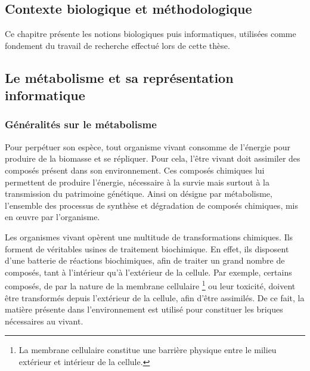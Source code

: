 \begin{refsegment}
	\chapter{Contexte biologique et méthodologique}

    Ce chapitre présente les notions biologiques puis informatiques, utilisées comme fondement du travail de recherche effectué lors de cette thèse.
    
    
    \section{Le métabolisme et sa représentation informatique}
    \subsection{Généralités sur le métabolisme}
    
    Pour perpétuer son espèce, tout organisme vivant consomme de l'énergie pour produire de la biomasse et se répliquer. Pour cela, l'être vivant doit assimiler des composés présent dans son environnement. Ces composés chimiques lui permettent de produire l'énergie, nécessaire à la survie mais surtout à la transmission du patrimoine génétique. Ainsi on désigne par métabolisme, l'ensemble des processus de synthèse et dégradation de composés chimiques, mis en œuvre par l'organisme. 
    
    
    Les organismes vivant opèrent une multitude de transformations chimiques. Ils forment de véritables usines de traitement biochimique. En effet, ils disposent d'une batterie de réactions biochimiques, afin de traiter un grand nombre de composés, tant à l'intérieur qu'à l'extérieur de la cellule. Par exemple, certains composés, de par la nature de la membrane cellulaire \footnote{La membrane cellulaire constitue une barrière physique entre le milieu extérieur et intérieur de la cellule.} ou leur toxicité, doivent être transformés depuis l'extérieur de la cellule, afin d'être assimilés. De ce fait, la matière présente dans l'environnement est utilisé pour constituer les briques nécessaires au vivant.
    

\end{refsegment}
